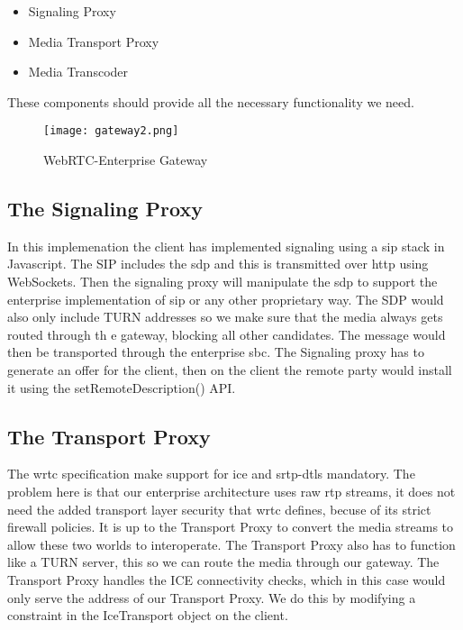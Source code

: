 \begin{itemize}
\item{Signaling Proxy}
\item{Media Transport Proxy}
\item{Media Transcoder}
\end{itemize}

These components should provide all the necessary functionality we need.
\\
\begin{figure}[here]
\centerline{\texttt{[image: gateway2.png]}}
\caption{WebRTC-Enterprise Gateway}
\label{fig:wrtc-enterprise-gateway}
\end{figure}

\subsection{The Signaling Proxy}
In this implemenation the client has implemented signaling using a \gls{sip} stack in Javascript. The SIP includes the \gls{sdp} and this is transmitted over \gls{http} using WebSockets. Then the signaling proxy will manipulate the \gls{sdp} to support the enterprise implementation of \gls{sip} or any other proprietary way. The SDP would also only include TURN addresses so we make sure that the media always gets routed through th e gateway, blocking all other candidates. The message would then be transported through the enterprise \gls{sbc}. The Signaling proxy has to generate an offer for the client, then on the client the remote party would install it using the setRemoteDescription() API.

\subsection{The Transport Proxy}
The \gls{wrtc} specification make support for \gls{ice} and \gls{srtp}-{dtls} mandatory. The problem here is that our enterprise architecture uses raw \gls{rtp} streams, it does not need the added transport layer security that \gls{wrtc} defines, becuse of its strict firewall policies. It is up to the Transport Proxy to convert the media streams to allow these two worlds to interoperate. The Transport Proxy also has to function like a TURN server, this so we can route the media through our gateway. The Transport Proxy handles the ICE connectivity checks, which in this case would only serve the address of our Transport Proxy. We do this by modifying a constraint in the IceTransport object on the client.

